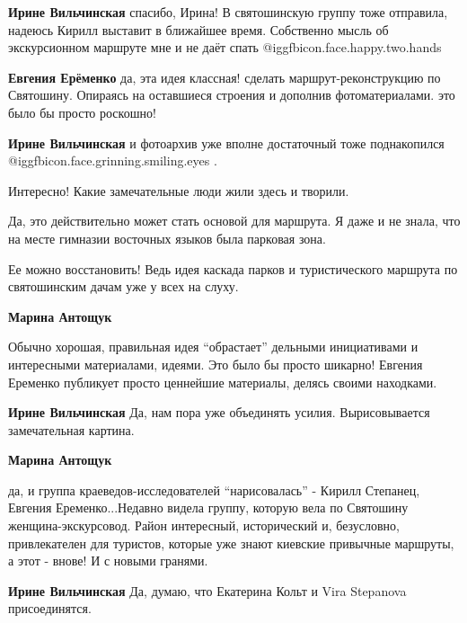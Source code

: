 \begin{itemize}
\begin{itemize} %
\textbf{Ирине Вильчинская} спасибо, Ирина! В святошинскую группу тоже отправила, надеюсь Кирилл выставит в ближайшее время. Собственно мысль об экскурсионном маршруте мне и не даёт спать  @igg{fbicon.face.happy.two.hands} 

\textbf{Евгения Ерёменко} да, эта идея классная! сделать маршрут-реконструкцию по Святошину. Опираясь на оставшиеся строения и дополнив фотоматериалами. это было бы просто роскошно!

\textbf{Ирине Вильчинская} и фотоархив уже вполне достаточный тоже поднакопился  @igg{fbicon.face.grinning.smiling.eyes} .
\end{itemize} %

Интересно! Какие замечательные люди жили здесь и творили.


Да, это действительно может стать основой для маршрута. Я даже и не знала, что
на месте гимназии восточных языков была парковая зона.

Ее можно восстановить! Ведь идея каскада парков и туристического маршрута по
святошинским дачам уже у всех на слуху.

\begin{itemize} %
\textbf{Марина Антощук} 

Обычно хорошая, правильная идея \enquote{обрастает} дельными инициативами и интересными
материалами, идеями. Это было бы просто шикарно! Евгения Еременко публикует
просто ценнейшие материалы, делясь своими находками.

\begin{itemize} %
\textbf{Ирине Вильчинская} Да, нам пора уже объединять усилия. Вырисовывается замечательная картина.

\textbf{Марина Антощук} 

да, и группа краеведов-исследователей \enquote{нарисовалась} - Кирилл Степанец, Евгения
Еременко...Недавно видела группу, которую вела по Святошину
женщина-экскурсовод. Район интересный, исторический и, безусловно,
привлекателен для туристов, которые уже знают киевские привычные маршруты, а
этот - внове! И с новыми гранями.


\textbf{Ирине Вильчинская} Да, думаю, что Екатерина Кольт и Vira Stepanova присоединятся.


\end{itemize}
\end{itemize}
\end{itemize}
